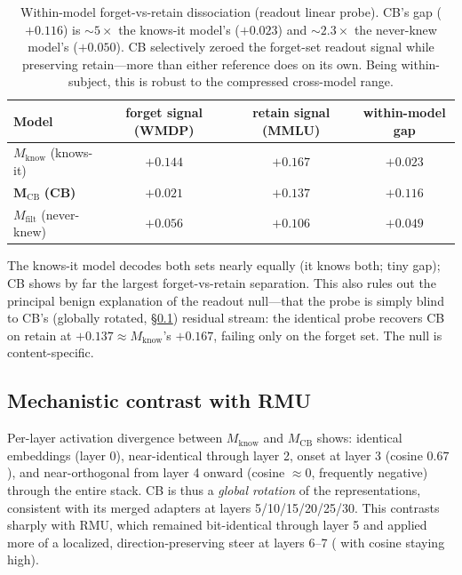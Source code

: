 \documentclass[11pt]{article}
\newcommand{\Mcb}{M_{\mathrm{CB}}}
\newcommand{\Mknows}{M_{\mathrm{know}}}
\newcommand{\Mnever}{M_{\mathrm{filt}}}
\begin{document}
\begin{table}[h]
\centering
\small
\begin{tabular}{lccc}
\toprule
Model & forget signal (WMDP) & retain signal (MMLU) & within-model gap \\
\midrule
$\Mknows$ (knows-it) & $+0.144$ & $+0.167$ & $+0.023$ \\
$\mathbf{\Mcb}$ \textbf{(CB)} & $\mathbf{+0.021}$ & $\mathbf{+0.137}$ & $\mathbf{+0.116}$ \\
$\Mnever$ (never-knew) & $+0.056$ & $+0.106$ & $+0.049$ \\
\bottomrule
\end{tabular}
\caption{Within-model forget-vs-retain dissociation (readout linear probe). CB's gap ($+0.116$)
is $\sim\!5\times$ the knows-it model's ($+0.023$) and $\sim\!2.3\times$ the never-knew model's
($+0.050$). CB selectively zeroed the forget-set readout signal while preserving retain---more
than either reference does on its own. Being within-subject, this is robust to the compressed
cross-model range.}
\label{tab:within}
\end{table}


The knows-it model decodes both sets nearly equally (it knows both; tiny gap); CB shows by far
the largest forget-vs-retain separation. This also rules out the principal benign explanation of
the readout null---that the probe is simply blind to CB's (globally rotated, \S\ref{sec:mech})
residual stream: the identical probe recovers CB on retain at $+0.137 \approx \Mknows$'s $+0.167$,
failing only on the forget set. The null is content-specific.
 
\subsection{Mechanistic contrast with RMU}
\label{sec:mech}
Per-layer activation divergence between $\Mknows$ and $\Mcb$ shows: identical embeddings (layer
0), near-identical through layer 2, onset at layer 3 (cosine $0.67$), and near-orthogonal from
layer 4 onward (cosine $\approx 0$, frequently negative) through the entire stack. CB is thus a
\emph{global rotation} of the representations, consistent with its merged adapters at layers
5/10/15/20/25/30. This contrasts sharply with RMU, which remained bit-identical through layer 5
and applied more of a localized, direction-preserving steer at layers 6--7 ( with cosine staying high).

 
\end{document}
